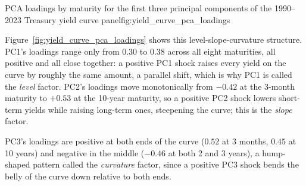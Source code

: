 \documentclass[../ai_in_finance]{subfiles}
\begin{document}
\begin{bookfigure}[htbp]{PCA loadings by maturity for the first three principal components of the 1990--2023 Treasury yield curve panel}{fig:yield_curve_pca_loadings}
\end{bookfigure}

Figure~\ref{fig:yield_curve_pca_loadings} shows this level-slope-curvature structure. PC1's loadings range only from $0.30$ to $0.38$ across all eight maturities, all positive and all close together: a positive PC1 shock raises every yield on the curve by roughly the same amount, a parallel shift, which is why PC1 is called the \emph{level} factor. PC2's loadings move monotonically from $-0.42$ at the 3-month maturity to $+0.53$ at the 10-year maturity, so a positive PC2 shock lowers short-term yields while raising long-term ones, steepening the curve; this is the \emph{slope} factor.

PC3's loadings are positive at both ends of the curve ($0.52$ at 3 months, $0.45$ at 10 years) and negative in the middle ($-0.46$ at both 2 and 3 years), a hump-shaped pattern called the \emph{curvature} factor, since a positive PC3 shock bends the belly of the curve down relative to both ends.
\end{document}

